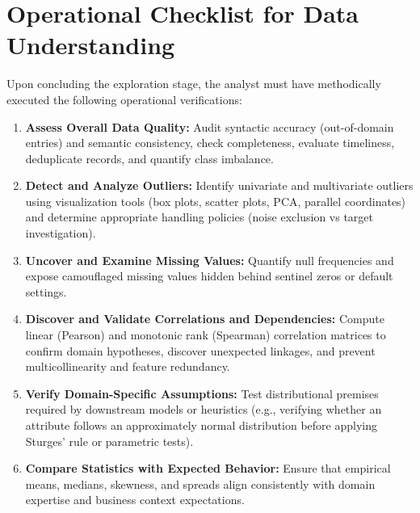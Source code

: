 \section{Operational Checklist for Data Understanding}
Upon concluding the exploration stage, the analyst must have methodically executed the following operational verifications:
\begin{enumerate}
    \item \textbf{Assess Overall Data Quality:} Audit syntactic accuracy (out-of-domain entries) and semantic consistency, check completeness, evaluate timeliness, deduplicate records, and quantify class imbalance.
    \item \textbf{Detect and Analyze Outliers:} Identify univariate and multivariate outliers using visualization tools (box plots, scatter plots, PCA, parallel coordinates) and determine appropriate handling policies (noise exclusion vs target investigation).
    \item \textbf{Uncover and Examine Missing Values:} Quantify null frequencies and expose camouflaged missing values hidden behind sentinel zeros or default settings.
    \item \textbf{Discover and Validate Correlations and Dependencies:} Compute linear (Pearson) and monotonic rank (Spearman) correlation matrices to confirm domain hypotheses, discover unexpected linkages, and prevent multicollinearity and feature redundancy.
    \item \textbf{Verify Domain-Specific Assumptions:} Test distributional premises required by downstream models or heuristics (e.g., verifying whether an attribute follows an approximately normal distribution before applying Sturges' rule or parametric tests).
    \item \textbf{Compare Statistics with Expected Behavior:} Ensure that empirical means, medians, skewness, and spreads align consistently with domain expertise and business context expectations.
\end{enumerate}

